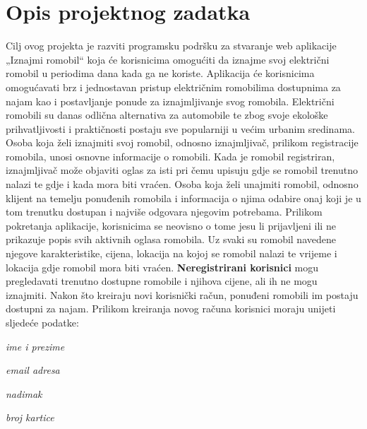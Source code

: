 \chapter{Opis projektnog zadatka}
		
		Cilj ovog projekta je razviti programsku podršku za stvaranje web aplikacije „Iznajmi romobil“ koja će korisnicima omogućiti da iznajme svoj električni romobil u periodima dana kada ga ne koriste. Aplikacija će korisnicima omogućavati brz i jednostavan pristup električnim romobilima dostupnima za najam kao i postavljanje ponude za iznajmljivanje svog romobila. Električni romobili su danas odlična alternativa za automobile te zbog svoje ekološke prihvatljivosti i praktičnosti postaju sve popularniji u većim urbanim sredinama. Osoba koja želi iznajmiti svoj romobil, odnosno iznajmljivač, prilikom registracije romobila, unosi osnovne informacije o romobili. Kada je romobil registriran, iznajmljivač može objaviti oglas za isti pri čemu upisuju gdje se romobil trenutno nalazi te gdje i kada mora biti vraćen. Osoba koja želi unajmiti romobil, odnosno klijent na temelju ponuđenih romobila i informacija o njima odabire onaj koji je u tom trenutku dostupan i najviše odgovara njegovim potrebama. 
		\newline 
		\newline
		Prilikom pokretanja aplikacije, korisnicima se neovisno o tome jesu li prijavljeni ili ne prikazuje popis svih aktivnih oglasa romobila. Uz svaki su romobil navedene njegove karakteristike, cijena, lokacija na kojoj se romobil nalazi te vrijeme i lokacija gdje romobil mora biti vraćen. \textbf{Neregistrirani korisnici} mogu pregledavati trenutno dostupne romobile i njihova cijene, ali ih ne mogu iznajmiti. Nakon što kreiraju novi korisnički račun, ponuđeni romobili im postaju dostupni za najam. Prilikom kreiranja novog računa korisnici moraju unijeti sljedeće podatke:
		
		\begin{packed_item}
			\item \textit{ime i prezime}
			\item \textit{email adresa}
			\item \textit{nadimak}
			\item \textit{broj kartice}
		\end{packed_item}
		
